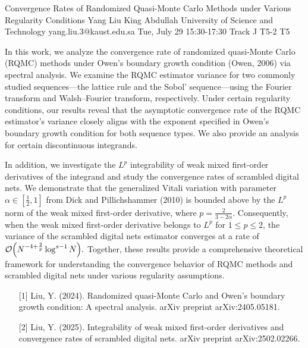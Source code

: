 \begin{talk}
  {Convergence Rates of Randomized Quasi-Monte Carlo Methods under Various Regularity Conditions}%
  {Yang Liu}%
  {King Abdullah University of Science and Technology}%
  {yang.liu.3@kaust.edu.sa}%
  {}%
  {}%
  {Tue, July 29 15:30-17:30 Track J}%
  {T5-2}%
  {T5}%
        
        In this work, we analyze the convergence rate of randomized quasi-Monte Carlo (RQMC) methods under Owen's boundary growth condition (Owen, 2006) via spectral analysis. We examine the RQMC estimator variance for two commonly studied sequences—the lattice rule and the Sobol' sequence—using the Fourier transform and Walsh–Fourier transform, respectively. Under certain regularity conditions, our results reveal that the asymptotic convergence rate of the RQMC estimator's variance closely aligns with the exponent specified in Owen's boundary growth condition for both sequence types. We also provide an analysis for certain discontinuous integrands.

        In addition, we investigate the \(L^p\) integrability of weak mixed first-order derivatives of the integrand and study the convergence rates of scrambled digital nets. We demonstrate that the generalized Vitali variation with parameter \(\alpha \in \left[\frac{1}{2}, 1\right]\) from Dick and Pillichshammer (2010) is bounded above by the \(L^p\) norm of the weak mixed first-order derivative, where \(p = \frac{2}{3-2\alpha}\). Consequently, when the weak mixed first-order derivative belongs to \(L^p\) for \(1 \leq p \leq 2\), the variance of the scrambled digital nets estimator converges at a rate of
        \(
        \mathcal{O}\Bigl(N^{-4+\frac{2}{p}} \log^{s-1} N\Bigr).
        \)
        Together, these results provide a comprehensive theoretical framework for understanding the convergence behavior of RQMC methods and scrambled digital nets under various regularity assumptions.
        

\medskip

\begin{enumerate}
	\item[{[1]}] Liu, Y. (2024). Randomized quasi-Monte Carlo and Owen's boundary growth condition: A spectral analysis. arXiv preprint arXiv:2405.05181.
	\item[{[2]}] Liu, Y. (2025). Integrability of weak mixed first-order derivatives and convergence rates of scrambled digital nets. arXiv preprint arXiv:2502.02266.
\end{enumerate}

\end{talk}
